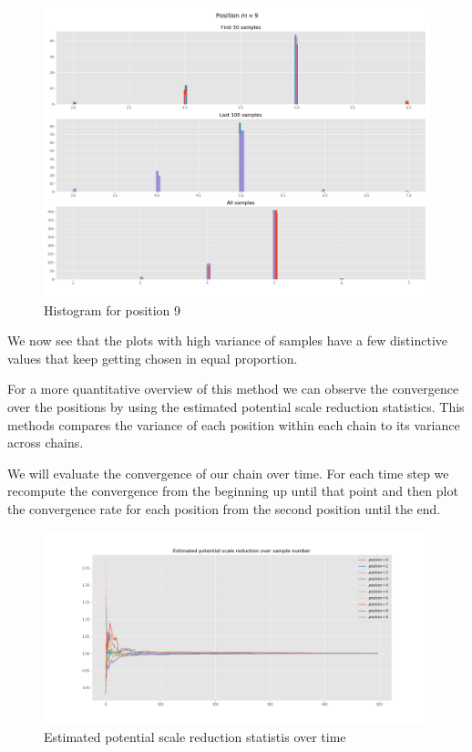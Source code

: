 \documentclass[]{article}
\begin{document}
	\begin{figure}[H]
		\begin{center}
			
			\includegraphics[width=.7\textwidth]{task4/figures/T_2_4/Q2/distribution_pos9.png}
			\caption*{Histogram for position 9}
		\end{center}
	\end{figure}
	
	We now see that the plots with high variance of samples have a few distinctive values that keep getting chosen in equal proportion.
	
	For a more quantitative overview of this method we can observe the convergence over the positions by using the estimated potential scale reduction statistics. This methods compares the variance of each position within each chain to its variance across chains.
	
	We will evaluate the convergence of our chain over time. For each time step we recompute the convergence from the beginning up until that point and then plot the convergence rate for each position from the second position until the end.
	
	\begin{figure}[H]
		\begin{center}
			
			\includegraphics[width=1\textwidth]{task4/figures/T_2_4/Q2/convergence_epsr.png}
			\caption*{Estimated potential scale reduction statistis over time}
		\end{center}
	\end{figure}
	
\end{document}
